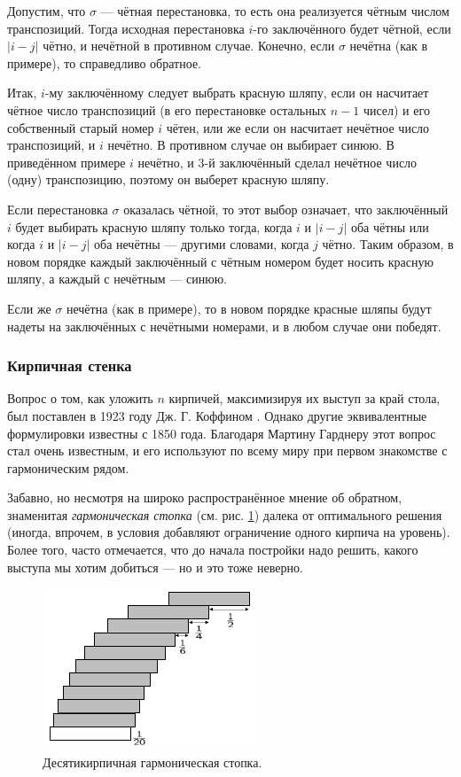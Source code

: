 Допустим, что $\sigma$ --- чётная перестановка, то есть она реализуется чётным числом транспозиций.
Тогда исходная перестановка $i$-го заключённого будет чётной, если $|i - j|$ чётно, и нечётной в противном случае.
Конечно, если $\sigma$ нечётна (как в примере), то справедливо обратное.

Итак, $i$-му заключённому следует выбрать красную шляпу, если он насчитает чётное число транспозиций (в его перестановке остальных $n - 1$ чисел) и его собственный старый номер $i$ чётен, или же если он насчитает нечётное число транспозиций, и $i$ нечётно.
В противном случае он выбирает синюю.
В приведённом примере $i$ нечётно, и $3$-й заключённый сделал нечётное число (одну) транспозицию, поэтому он выберет красную шляпу.

Если перестановка $\sigma$ оказалась чётной, то этот выбор означает, что заключённый $i$ будет выбирать красную шляпу только тогда, когда $i$ и $|i - j|$ оба чётны или когда $i$ и $|i - j|$ оба нечётны --- другими словами, когда $j$ чётно.
Таким образом, в новом порядке каждый заключённый с чётным номером будет носить красную шляпу, а каждый с нечётным --- синюю.

Если же $\sigma$ нечётна (как в примере), то в новом порядке красные шляпы будут надеты на заключённых с нечётными номерами, и в любом случае они победят.

\subsubsection*{Кирпичная стенка}

Вопрос о том, как уложить $n$ кирпичей, максимизируя их выступ за край стола, был поставлен в 1923 году Дж. Г. Коффином \cite{12}.
Однако другие эквивалентные формулировки известны с 1850 года.
Благодаря Мартину Гарднеру этот вопрос стал очень известным, и его используют по всему миру при первом знакомстве с гармоническим рядом.

Забавно, но несмотря на широко распространённое мнение об обратном, знаменитая \emph{гармоническая стопка} (см. рис. \ref{pic:kirpich1}) далека от оптимального решения (иногда, впрочем, в условия добавляют ограничение одного кирпича на уровень).
Более того, часто отмечается, что до начала постройки надо решить, какого выступа мы хотим добиться --- но и это тоже неверно.

\begin{figure}[ht!]
\centering
\includegraphics[scale=1]{pics/kirpich1}
\caption{Десятикирпичная гармоническая стопка.}
\label{pic:kirpich1}
\end{figure}

